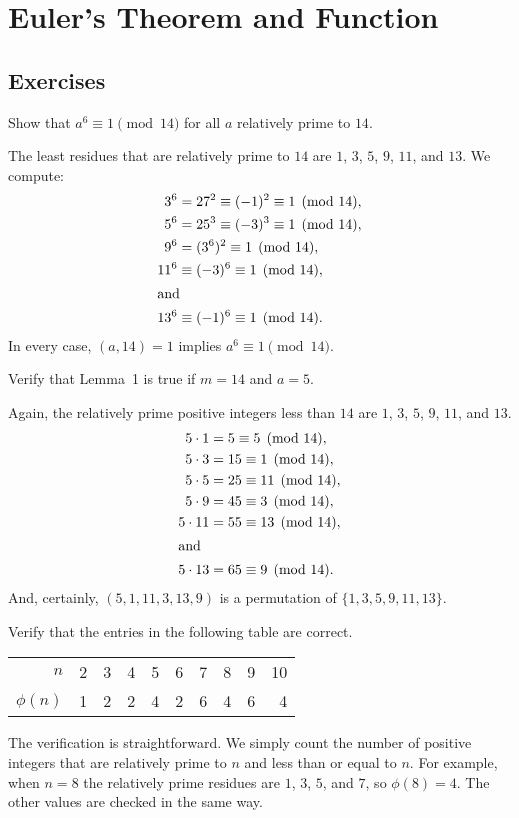 \chapter{Euler's Theorem and Function}

\section{Exercises}

 Show that $a^6\equiv1\pmod{14}$ for all $a$ relatively
prime to $14$.
\begin{solution}
  The least residues that are relatively prime to $14$ are $1$, $3$,
  $5$, $9$, $11$, and $13$. We compute:
  \begin{align*}
    3^6 &= 27^2 \equiv (-1)^2 \equiv 1\pmod{14}, \\
    5^6 &= 25^3 \equiv (-3)^3 \equiv 1\pmod{14}, \\
    9^6 &= (3^6)^2 \equiv 1\pmod{14}, \\
    11^6 &\equiv (-3)^6 \equiv 1\pmod{14}, \\
    \intertext{and}
    13^6 &\equiv (-1)^6 \equiv 1\pmod{14}.
  \end{align*}
  In every case, $(a,14) = 1$ implies $a^6\equiv1\pmod{14}$.
\end{solution}

 Verify that Lemma~1 is true if $m = 14$ and $a = 5$.
\begin{solution}
  Again, the relatively prime positive integers less than $14$ are
  $1$, $3$, $5$, $9$, $11$, and $13$.
  \begin{align*}
    5\cdot1 &= 5 \equiv 5\pmod{14}, \\
    5\cdot3 &= 15 \equiv 1\pmod{14}, \\
    5\cdot5 &= 25 \equiv 11\pmod{14}, \\
    5\cdot9 &= 45 \equiv 3\pmod{14}, \\
    5\cdot11 &= 55 \equiv 13\pmod{14}, \\
    \intertext{and}
    5\cdot13 &= 65 \equiv 9\pmod{14}.
  \end{align*}
  And, certainly, $(5,1,11,3,13,9)$ is a permutation of
  $\{1,3,5,9,11,13\}$.
\end{solution}

 Verify that the entries in the following table are correct.
\begin{center}
  \begin{tabular}{r|rrrrrrrrr}
    $n$ & 2 & 3 & 4 & 5 & 6 & 7 & 8 & 9 & 10 \\
    $\phi(n)$ & 1 & 2 & 2 & 4 & 2 & 6 & 4 & 6 & 4
  \end{tabular}
\end{center}
\begin{solution}
  The verification is straightforward. We simply count the number of
  positive integers that are relatively prime to $n$ and less than or
  equal to $n$. For example, when $n = 8$ the relatively prime
  residues are $1$, $3$, $5$, and $7$, so $\phi(8) = 4$. The other
  values are checked in the same way.
\end{solution}

